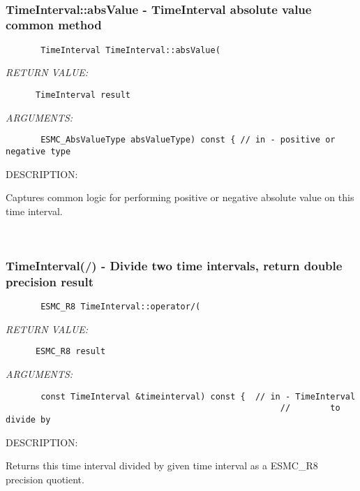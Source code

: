  
\mbox{}\hrulefill\
 
\subsubsection [TimeInterval::absValue] {TimeInterval::absValue - TimeInterval absolute value common method}


  
\begin{verbatim}       TimeInterval TimeInterval::absValue(\end{verbatim}{\em RETURN VALUE:}
\begin{verbatim}      TimeInterval result\end{verbatim}{\em ARGUMENTS:}
\begin{verbatim}       ESMC_AbsValueType absValueType) const { // in - positive or negative type\end{verbatim}
{\sf DESCRIPTION:\\ }


        Captures common logic for performing positive or negative
        absolute value on this time interval.
   
 
\mbox{}\hrulefill\ 
 
\subsubsection [TimeInterval(/)] {TimeInterval(/) - Divide two time intervals, return double precision result}


  
\begin{verbatim}       ESMC_R8 TimeInterval::operator/(\end{verbatim}{\em RETURN VALUE:}
\begin{verbatim}      ESMC_R8 result\end{verbatim}{\em ARGUMENTS:}
\begin{verbatim}       const TimeInterval &timeinterval) const {  // in - TimeInterval
                                                       //        to divide by\end{verbatim}
{\sf DESCRIPTION:\\ }


      Returns this time interval divided by given time interval as a ESMC_R8
      precision quotient.
   
